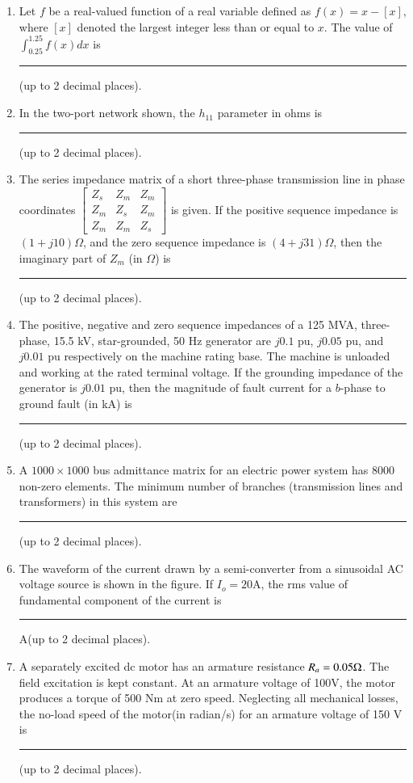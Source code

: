 \documentclass[journal,12pt,onecolumn]{IEEEtran}
\theoremstyle{remark}
\begin{document}
\begin{enumerate}
    \item Let $f$ be a real-valued function of a real variable defined as $f(x)=x-[x]$, where $[x]$ denoted the largest integer less than or equal to $x$. The value of $\int_{0.25}^{1.25} f(x)dx$ is \rule{2cm}{0.4pt}(up to 2 decimal places).
    
    \item In the two-port network shown, the $h_{11}$ parameter  in ohms is \rule{2.5cm}{0.4pt}(up to 2 decimal places).
    
    
    \item The series impedance matrix of a short three-phase transmission line in phase coordinates
$
\begin{bmatrix}
Z_s & Z_m & Z_m \\
Z_m & Z_s & Z_m \\
Z_m & Z_m & Z_s 
\end{bmatrix}
$
is given. If the positive sequence impedance is $ (1 + j10) \Omega $, and the zero sequence impedance is $ (4 + j31) \Omega$, then the imaginary part of $ Z_m $ (in $ \Omega $) is \rule{2.5cm}{0.4pt} (up to 2 decimal places).

\item The positive, negative and zero sequence impedances of a 125 MVA, three-phase, 15.5 kV, star-grounded, 50 Hz generator are $ j0.1 $ pu, $ j0.05 $ pu, and $ j0.01 $ pu respectively on the machine rating base. The machine is unloaded and working at the rated terminal voltage. If the grounding impedance of the generator is $ j0.01 $ pu, then the magnitude of fault current for a $ b $-phase to ground fault (in kA) is \rule{2cm}{0.4pt} (up to 2 decimal places).

\item A $ 1000 \times 1000$ bus admittance matrix for an electric power system has 8000 non-zero elements. The minimum number of branches (transmission lines and transformers) in this system are \rule{2cm}{0.4pt}(up to 2 decimal places).

\item The waveform of the current drawn by a semi-converter from a sinusoidal AC voltage source is shown in the figure. If $I_o=20$A, the rms value of fundamental component of the current is \rule{2cm}{0.4pt}A(up to 2 decimal places).


\item A separately excited dc motor has an armature resistance $R_a=0.05\ohm$. The field excitation is kept constant. At an armature voltage of 100V, the motor produces a torque of 500 Nm at zero speed. Neglecting all mechanical losses, the no-load speed of the motor(in radian/s) for an armature voltage of 150 V is \rule{2cm}{0.4pt}(up to 2 decimal places).


\end{enumerate}
\end{document}
